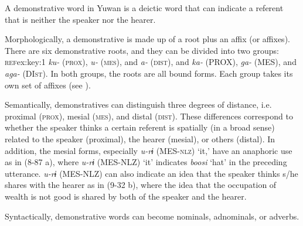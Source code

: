 A demonstrative word in Yuwan is a deictic word that can indicate a referent that is neither the speaker nor the hearer.

  Morphologically, a demonstrative is made up of a root plus an affix (or affixes). There are six demonstrative roots, and they can be divided into two groups: \textsc{ref}{ex:key:1} \textit{ku-} (\textsc{prox}), \textit{u-} (\textsc{mes}), and \textit{a-} (\textsc{dist}), and  \textit{ka-} (PROX), \textit{ga-} (MES), and \textit{aga-} (DI\textsc{st}). In both groups, the roots are all bound forms. Each group takes its own set of affixes (see ).

  Semantically, demonstratives can distinguish three degrees of distance, i.e. proximal (\textsc{prox}), mesial (\textsc{mes}), and distal (\textsc{dist}). These differences correspond to whether the speaker thinks a certain referent is spatially (in a broad sense) related to the speaker (proximal), the hearer (mesial), or others (distal). In addition, the mesial forms, especially \textit{u-rɨ} (MES-\textsc{nlz}) ‘it,’ have an anaphoric use as in (8-87 a), where \textit{u-rɨ} (MES-NLZ) ‘it’ indicates \textit{boosi} ‘hat’ in the preceding utterance. \textit{u-rɨ} (MES-NLZ) can also indicate an idea that the speaker thinks s/he shares with the hearer as in (9-32 b), where the idea that the occupation of wealth is not good is shared by both of the speaker and the hearer.

Syntactically, demonstrative words can become nominals, adnominals, or adverbs.

